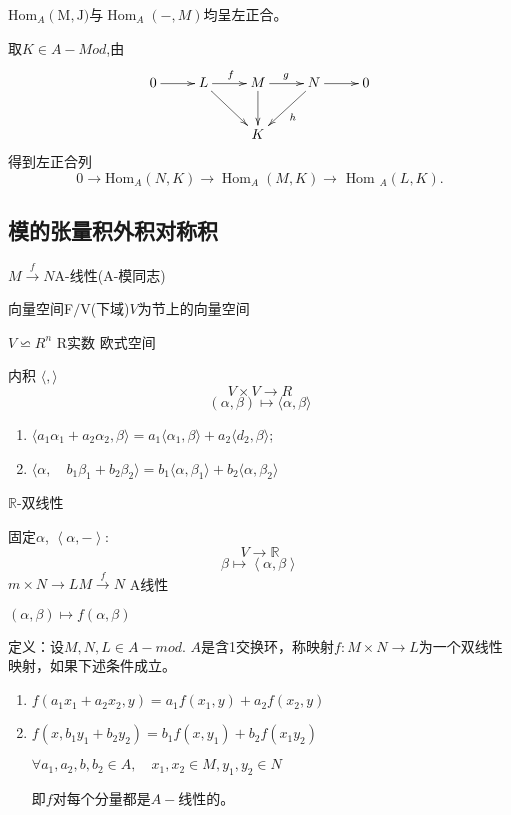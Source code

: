 \documentclass[UTF8]{article}
\begin{document}
$\mathrm{Hom}_{A}\left(\mathrm{M},\mathrm{J})\right.$与$\operatorname{Hom}_{A}(-, M)$均呈左正合。

取$K\in A-Mod$,由
$$
\xymatrix{
	0\ar[r]&L\ar[r]^{f}\ar[rd]&M\ar[r]^{g}\ar[d]&N\ar[ld]^{h}\ar[r]&0\\
	& & K & &\\
}
$$
得到左正合列
\[
0 \rightarrow \mathrm{Hom}_{A}(N, K) \rightarrow \operatorname{Hom}_{A}(M, K)\rightarrow \text { Hom }_{A}(L,K).
\]

\subsection {模的张量积\qquad 外积\qquad  对称积}

$M \stackrel{f}{\rightarrow} N$\qquad  A-线性(A-模同志)

向量空间\quad F$\slash$V\quad  (下域)\quad  $V$为节上的向量空间

$V \backsimeq R^{n}$   R实数 欧式空间

内积 $\langle, \rangle$
$$V \times V  \longrightarrow R$$
$$(\alpha,\beta)\mapsto\langle\alpha, \beta\rangle$$
\begin{enumerate}
	\item $\langle a_{1} \alpha_{1}+a_{2} \alpha_{2}, \beta\rangle=a_{1}\langle\alpha_{1}, \beta\rangle+a_{2}\langle d_{2}, \beta\rangle$;
	\item $\langle\alpha, \quad b_{1} \beta_{1}+b_{2} \beta_{2}\rangle=b_{1}\langle\alpha, \beta_{1}\rangle+b_{2}\langle\alpha, \beta_{2}\rangle$
\end{enumerate}

$\mathbb{R}$-双线性

固定$\alpha$, $\left\langle\alpha,-\right\rangle$: $$V \rightarrow \mathbb{R}$$
$$\beta\mapsto\left\langle\alpha,\beta\right\rangle$$
$m \times N \rightarrow L$\qquad $M \stackrel{f}{\rightarrow} N$ A线性


$(\alpha, \beta)  \longmapsto f\left(\alpha, \beta\right)$


定义：设$M,N,L\in A-mod$. $A$是含1交换环，称映射$f:M \times N \rightarrow L$为一个双线性映射，如果下述条件成立。
\begin{enumerate}
	\item $f\left(a_{1} x_{1}+a_{2} x_{2}, y\right)=a_{1} f\left(x_{1}, y\right)+a_{2} f\left(x_{2}, y\right)$
	\item $f(x,b_1y_1+b_2y_2)=b_{1} f\left(x, y_{1}\right)+b_{2} f\left(x_{1} y_{2}\right)$
	
	$\forall a_{1}, a_{2}, b, b_{2} \in A, \quad x_{1}, x_{2}\in M ,y_{1}, y_{2} \in N$
	
	即$f$对每个分量都是$A-$线性的。
	
	
\end{enumerate}
\end{document}
